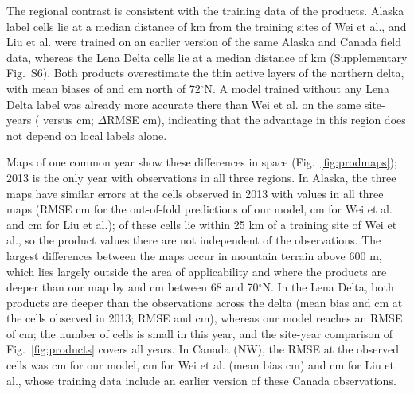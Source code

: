 The regional contrast is consistent with the training data of the products. Alaska label cells lie at a median distance of \ndistweiAkmed{} km from the training sites of Wei et al., and Liu et al. were trained on an earlier version of the same Alaska and Canada field data, whereas the Lena Delta cells lie at a median distance of \ndistweiLemed{} km (Supplementary Fig.~S6). Both products overestimate the thin active layers of the northern delta, with mean biases of \nbiasLeNorthWei{} and \nbiasLeNorthLiu{} cm north of 72$^\circ$N. A model trained without any Lena Delta label was already more accurate there than Wei et al. on the same site-years (\ntlvprmseLeRsWeizero{} versus \ntlvprmseLeWeizero{} cm; $\Delta$RMSE \ntlvpLeRsWeizero{} cm), indicating that the advantage in this region does not depend on local labels alone.

Maps of one common year show these differences in space (Fig.~\ref{fig:prodmaps}); 2013 is the only year with observations in all three regions. In Alaska, the three maps have similar errors at the \nfeAkN{} cells observed in 2013 with values in all three maps (RMSE \nfeAkOof{} cm for the out-of-fold predictions of our model, \nfeAkWei{} cm for Wei et al. and \nfeAkLiu{} cm for Liu et al.); \nfeAkNearWei{} of these cells lie within 25 km of a training site of Wei et al., so the product values there are not independent of the observations. The largest differences between the maps occur in mountain terrain above 600 m, which lies largely outside the area of applicability and where the products are deeper than our map by \nmapAkFootMtnWei{} and \nmapAkFootMtnLiu{} cm between 68 and 70$^\circ$N. In the Lena Delta, both products are deeper than the observations across the delta (mean bias \nfeLeBiasWei{} and \nfeLeBiasLiu{} cm at the \nfeLeN{} cells observed in 2013; RMSE \nfeLeWei{} and \nfeLeLiu{} cm), whereas our model reaches an RMSE of \nfeLeOof{} cm; the number of cells is small in this year, and the site-year comparison of Fig.~\ref{fig:products} covers all years. In Canada (NW), the RMSE at the \nfeCaN{} observed cells was \nfeCaOof{} cm for our model, \nfeCaWei{} cm for Wei et al. (mean bias \nfeCaBiasWei{} cm) and \nfeCaLiu{} cm for Liu et al., whose training data include an earlier version of these Canada observations.

